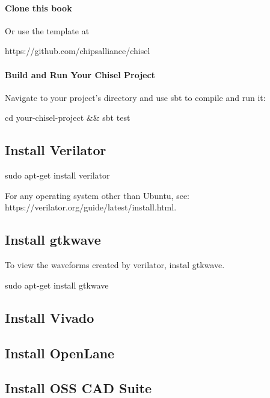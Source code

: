 \paragraph{Clone this book}
Or use the template at 
\begin{bashcode}
https://github.com/chipsalliance/chisel
\end{bashcode}

\paragraph{Build and Run Your Chisel Project}
Navigate to your project's directory and use sbt to compile and run it:
\begin{bashcode}
cd your-chisel-project && sbt test
\end{bashcode}

\subsection{Install Verilator}
\begin{bashcode}
sudo apt-get install verilator
\end{bashcode}

For any operating system other than Ubuntu, see: https://verilator.org/guide/latest/install.html.

\subsection{Install gtkwave}
To view the waveforms created by verilator, instal gtkwave.
\begin{bashcode}
sudo apt-get install gtkwave
\end{bashcode}

\subsection{Install Vivado}

\subsection{Install OpenLane}

\subsection{Install OSS CAD Suite}

